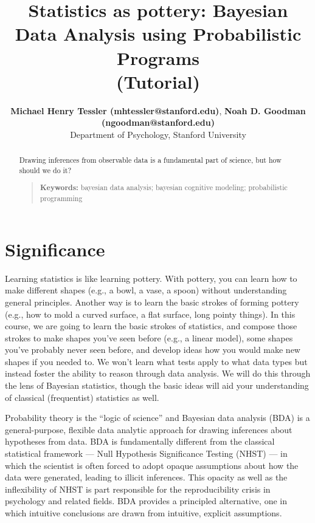 \documentclass[10pt,letterpaper]{article}
\title{Statistics as pottery: Bayesian Data Analysis using Probabilistic Programs \\(Tutorial)}
\author{{\large \bf Michael Henry Tessler (mhtessler@stanford.edu)}, {\large \bf Noah D. Goodman (ngoodman@stanford.edu)}  \\
  Department of Psychology, Stanford University
  }
\begin{document}
\maketitle

\begin{abstract}

Drawing inferences from observable data is a fundamental part of science, but how should we do it?
\begin{quote}
\small
\textbf{Keywords:} 
bayesian data analysis; bayesian cognitive modeling; probabilistic programming
\end{quote}

\end{abstract}





\section{Significance}

Learning statistics is like learning pottery. 
With pottery, you can learn how to make different shapes (e.g., a bowl, a vase, a spoon) without understanding general principles. 
Another way is to learn the basic strokes of forming pottery (e.g., how to mold a curved surface, a flat surface, long pointy things). 
In this course, we are going to learn the basic strokes of statistics, and compose those strokes to make shapes you've seen before (e.g., a linear model), some shapes you've probably never seen before, and develop ideas how you would make new shapes if you needed to. 
We won't learn what tests apply to what data types but instead foster the ability to reason through data analysis. 
We will do this through the lens of Bayesian statistics, though the basic ideas will aid your understanding of classical (frequentist) statistics as well.


Probability theory is the ``logic of science'' \cite{jaynes2003probability} and Bayesian data analysis (BDA) is a general-purpose, flexible data analytic approach for drawing inferences about hypotheses from data.
BDA is fundamentally different from the classical statistical framework --- Null Hypothesis Significance Testing (NHST) --- in which the scientist is often forced to adopt opaque assumptions about how the data were generated, leading to illicit inferences.
This opacity as well as the inflexibility of NHST is part responsible for the reproducibility crisis in psychology and related fields. 
BDA provides a principled alternative, one in which intuitive conclusions are drawn from intuitive, explicit assumptions.
\end{document}
